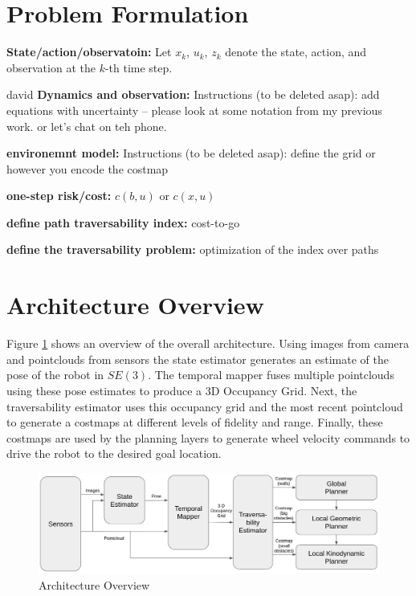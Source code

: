 \documentclass[letterpaper, 10 pt, conference]{ieeeconf}  %
\newcommand{\pr}[1]{\textbf{#1:}}  %
\newcommand{\todo}[1]{{\color{red} #1 }} %
\newcommand{\inst}[1]{{\color{orange} Instructions (to be deleted asap): #1 }} %
\begin{document}
\section{Problem Formulation}
\pr{State/action/observatoin}
Let $x_k$, $u_k$, $z_k$ denote the state, action, and observation at the $k$-th time step. 

\todo{david} \pr{Dynamics and observation}
\inst{add equations with uncertainty -- please look at some notation from my previous work. or let's chat on teh phone.}

\pr{environemnt model}
\inst{define the grid or however you encode the costmap}

\pr{one-step risk/cost}
$c(b,u)$ or $c(x,u)$

\pr{define path traversability index}
cost-to-go

\pr{define the traversability problem}
optimization of the index over paths

\section{Architecture Overview}
Figure \ref{fig:ArchitectureOverview} shows an overview of the overall architecture.
Using images from camera and pointclouds from sensors the state estimator generates an estimate of the pose of the robot in $SE(3)$.
The temporal mapper fuses multiple pointclouds using these pose estimates to produce a 3D Occupancy Grid.
Next, the traversability estimator uses this occupancy grid and the most recent pointcloud to generate a costmaps at different levels of fidelity and range.
Finally, these costmaps are used by the planning layers to generate wheel velocity commands to drive the robot to the desired goal location.

\begin{figure}[t!]
    \centering
    \includegraphics[width=\linewidth]{Traversability/figs/Arch.png}
    \caption{Architecture Overview}
    \label{fig:ArchitectureOverview}
\end{figure}
\end{document}
